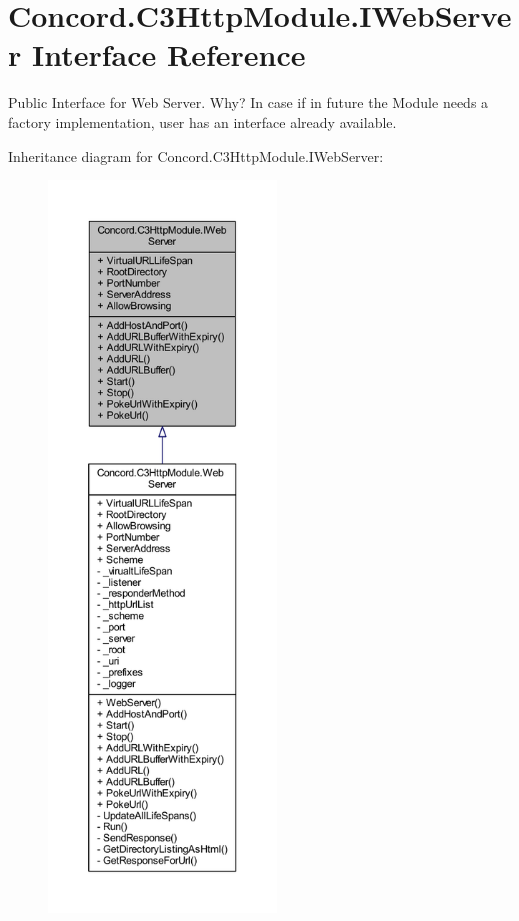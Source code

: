 \hypertarget{interface_concord_1_1_c3_http_module_1_1_i_web_server}{}\section{Concord.\+C3\+Http\+Module.\+I\+Web\+Server Interface Reference}
\label{interface_concord_1_1_c3_http_module_1_1_i_web_server}


Public Interface for Web Server. Why? In case if in future the Module needs a factory implementation, user has an interface already available.  




Inheritance diagram for Concord.\+C3\+Http\+Module.\+I\+Web\+Server\+:
\nopagebreak
\begin{figure}[H]
\begin{center}
\leavevmode
\includegraphics[height=550pt]{interface_concord_1_1_c3_http_module_1_1_i_web_server__inherit__graph}
\end{center}
\end{figure}


